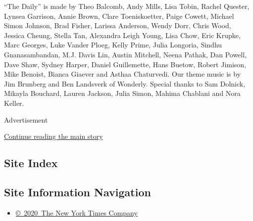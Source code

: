 ``The Daily'' is made by Theo Balcomb, Andy Mills, Lisa Tobin, Rachel
Quester, Lynsea Garrison, Annie Brown, Clare Toeniskoetter, Paige
Cowett, Michael Simon Johnson, Brad Fisher, Larissa Anderson, Wendy
Dorr, Chris Wood, Jessica Cheung, Stella Tan, Alexandra Leigh Young,
Lisa Chow, Eric Krupke, Marc Georges, Luke Vander Ploeg, Kelly Prime,
Julia Longoria, Sindhu Gnanasambandan, M.J. Davis Lin, Austin Mitchell,
Neena Pathak, Dan Powell, Dave Shaw, Sydney Harper, Daniel Guillemette,
Hans Buetow, Robert Jimison, Mike Benoist, Bianca Giaever and Asthaa
Chaturvedi. Our theme music is by Jim Brunberg and Ben Landsverk of
Wonderly. Special thanks to Sam Dolnick, Mikayla Bouchard, Lauren
Jackson, Julia Simon, Mahima Chablani and Nora Keller.

Advertisement

\protect\hyperlink{after-bottom}{Continue reading the main story}

\hypertarget{site-index}{%
\subsection{Site Index}\label{site-index}}

\hypertarget{site-information-navigation}{%
\subsection{Site Information
Navigation}\label{site-information-navigation}}

\begin{itemize}
\tightlist
\item
  \href{https://help.nytimes3xbfgragh.onion/hc/en-us/articles/115014792127-Copyright-notice}{©~2020~The
  New York Times Company}
\end{itemize}


